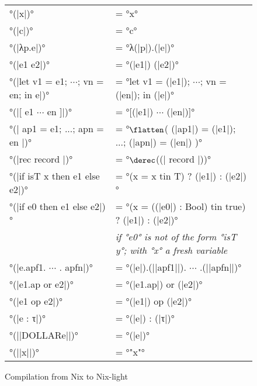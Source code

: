 \begin{figure}[H]
  \begin{tabular}{ll}
    °(|x|)° &= °x° \\
    °(|c|)° &= °c°\\
    °(|λp.e|)° &= °λ(|p|).(|e|)°\\
    °(|e1 e2|)° &= °(|e1|) (|e2|)°\\
    °(|let v1 = e1; $\cdots$; vn = en; in e|)° &=
      °let v1 = (|e1|); $\cdots$; vn = (|en|); in (|e|)°\\
    °(|[ e1 $\cdots$ en ]|)° &= °[(|e1|) $\cdots$ (|en|)]°\\
    °(|{ ap1 = e1; ...; apn = en }|)° &= °$\flatten$({ (|ap1|) = (|e1|); ...; (|apn|) = (|en|) })°\\
    °(|rec { record }|)° &= °$\derec$((|{ record }|))°\\
    °(|if isT x then e1 else e2|)° &= °(x = x tin T) ? (|e1|) : (|e2|)°\\
    °(|if e0 then e1 else e2|)° &=
      °(x = ((|e0|) : Bool) tin true) ? (|e1|) : (|e2|)°\\
    &{\itshape
      if °e0° is not of the form °isT y°;
      with °x° a fresh variable} \\
    °(|e.apf1. $\cdots$ . apfn|)° &= °(|e|).(||apf1||). $\cdots$ .(||apfn||)°\\
    °(|e1.ap or e2|)° &= °(|e1.ap|) or (|e2|)°\\
    °(|e1 op e2|)° &= °(|e1|) op (|e2|)°\\
    °(|e : τ|)° &= °(|e|) : (|τ|)°\\

    °(||DOLLAR{e}||)° &= °(|e|)°\\
    °(||x||)° &= °"x"°
  \end{tabular}
  \caption{Compilation from Nix to Nix-light}\label{nix-light::compilation}
\end{figure}
